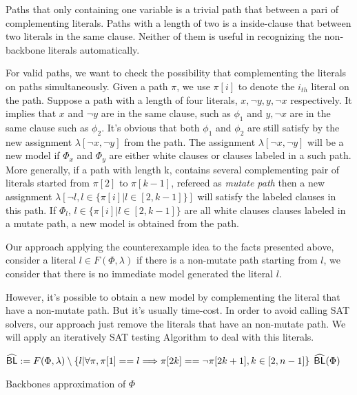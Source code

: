   Paths that only containing one variable is a trivial path that between a pari of complementing literals. Paths with a length of two is a inside-clause that between two literals in the same clause. Neither of them is useful in recognizing the non-backbone literals automatically.

 For valid paths, we want to check the possibility that complementing the literals on paths simultaneously. Given a path $\pi$, we use $\pi[i]$ to denote the $i_{th}$ literal on the path. Suppose a path with a length of four literals, $x, \neg y, y, \neg x$ respectively. It implies that $x$ and $\neg y$ are in the same clause, such as $\phi_1$ and $y, \neg x$ are in the same clause such as $\phi_2$. It's obvious that both $\phi_1$ and $\phi_2$ are still satisfy by the new assignment $\lambda[\neg x, \neg y]$ from the path. The assignment $\lambda[\neg x, \neg y]$ will be a new model if $\Phi_x$ and $\Phi_y$ are either white clauses or clauses labeled in a such path. More generally, if a path with length k, contains several complementing pair of literals started from $\pi[2]$ to $\pi[k-1]$, refereed as \emph{mutate path} then a new assignment $\lambda[\neg l, l\in\{\pi[i] | l\in[2, k-1]\}]$ will satisfy the labeled clauses in this path. If $\Phi_l$, $l\in\{\pi[i] | l\in[2, k-1]\}$ are all white clauses clauses labeled in a mutate path, a new model is obtained from the path.

 Our approach applying the counterexample idea to the facts presented above, consider a literal $l\in F(\Phi, \lambda)$ if there is a non-mutate path starting from $l$, we consider that there is no immediate model generated the literal $l$.

 However, it's possible to obtain a new model by complementing the literal that have a non-mutate path. But it's usually time-cost. In order to avoid calling SAT solvers, our approach just remove the literals that have an non-mutate path. We will apply an iteratively SAT testing Algorithm to deal with this literals.


\begin{algorithm}
\SetAlgoShortEnd
\SetFillComment
{}

${\sf \widehat{BL}}:=F(\Phi, \lambda)\setminus\{l | \forall \pi, \pi[1]==l\Longrightarrow\pi[2k]==\neg\pi[2k+1], k\in[2,n-1]\}$\;
\Return ${\sf \widehat{BL}}(\Phi)$\;
\caption{Backbones approximation of $\Phi$}
\label{alg:nBLo}
\end{algorithm}

